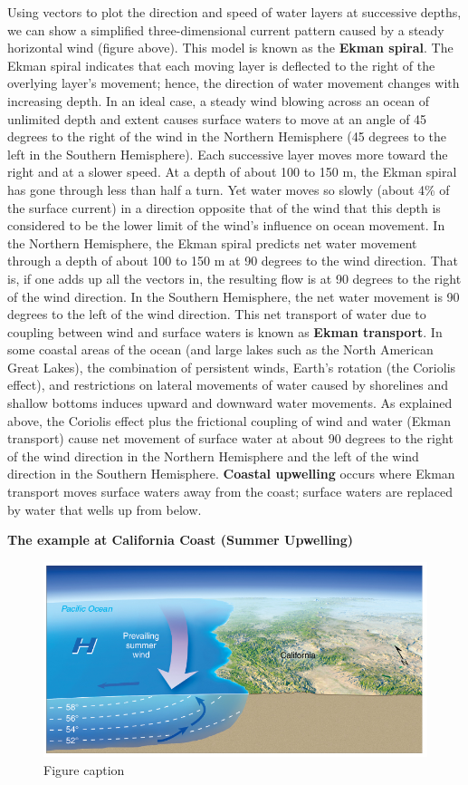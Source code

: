 \documentclass[12pt,oneside]{book}
\begin{document}
Using vectors to plot the direction and speed of water layers at
successive depths, we can show a simplified three-dimensional current
pattern caused by a steady horizontal wind (figure above). This model is
known as the \textbf{Ekman spiral}. The Ekman spiral indicates that each
moving layer is deflected to the right of the overlying layer's
movement; hence, the direction of water movement changes with increasing
depth. In an ideal case, a steady wind blowing across an ocean of
unlimited depth and extent causes surface waters to move at an angle of
45 degrees to the right of the wind in the Northern Hemisphere (45
degrees to the left in the Southern Hemisphere). Each successive layer
moves more toward the right and at a slower speed. At a depth of about
100 to 150 m, the Ekman spiral has gone through less than half a turn.
Yet water moves so slowly (about 4\% of the surface current) in a
direction opposite that of the wind that this depth is considered to be
the lower limit of the wind's influence on ocean movement. In the
Northern Hemisphere, the Ekman spiral predicts net water movement
through a depth of about 100 to 150 m at 90 degrees to the wind
direction. That is, if one adds up all the vectors in, the resulting
flow is at 90 degrees to the right of the wind direction. In the
Southern Hemisphere, the net water movement is 90 degrees to the left of
the wind direction. This net transport of water due to coupling between
wind and surface waters is known as \textbf{Ekman transport}. In some
coastal areas of the ocean (and large lakes such as the North American
Great Lakes), the combination of persistent winds, Earth's rotation (the
Coriolis effect), and restrictions on lateral movements of water caused
by shorelines and shallow bottoms induces upward and downward water
movements. As explained above, the Coriolis effect plus the frictional
coupling of wind and water (Ekman transport) cause net movement of
surface water at about 90 degrees to the right of the wind direction in
the Northern Hemisphere and the left of the wind direction in the
Southern Hemisphere. \textbf{Coastal upwelling} occurs where Ekman
transport moves surface waters away from the coast; surface waters are
replaced by water that wells up from below.

\textbf{The example at California Coast (Summer Upwelling)}

\begin{figure}

{\centering \includegraphics[width=0.8\linewidth]{figures/Figure532c} 

}

\caption{Figure caption}\label{fig:Fig532c}
\end{figure}
\end{document}
